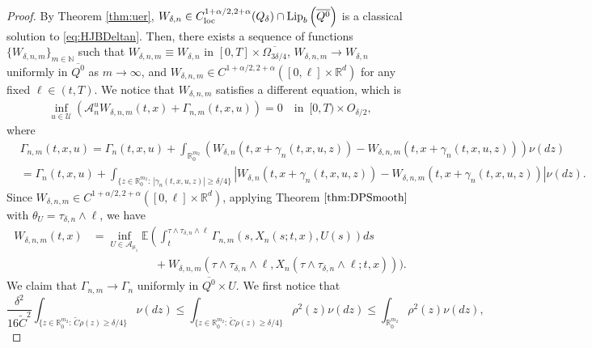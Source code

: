 \documentclass[amscd,amssymb,11pt]{article}
\numberwithin{theorem}{section}
\numberwithin{equation}{section}
\begin{document}
\begin{proof}
By Theorem \ref{thm:uer}, $W_{\delta,n}\in C^{1+\alpha/2,2+\alpha}_{\rm loc}(Q_{\delta})\cap{\rm Lip}_{b}\left(\overline{Q^{0}}\right)$ is a classical solution to \eqref{eq:HJBDeltan}. Then, there exists a sequence of functions $\{W_{\delta,n,m}\}_{m\in\mathbb N}$ such that $W_{\delta,n,m}\equiv W_{\delta,n}$ in $[0,T]\times \overline{\Omega_{3\delta/4}}$, $W_{\delta,n,m}\rightarrow W_{\delta,n}$ uniformly in $\overline{Q^{0}}$ as $m\rightarrow\infty$, and $W_{\delta,n,m}\in C^{1+\alpha/2,2+\alpha}([0,\ell]\times \mathbb R^d)$ for any fixed $\ell\in (t,T)$. We notice that $W_{\delta,n,m}$ satisfies a different equation, which is
\begin{eqnarray*}
\inf_{u\in\mathcal{U}}\left(\mathscr{A}_{n}^{u}W_{\delta,n,m}(t,x)+\Gamma_{n,m}(t,x,u)\right)=0\quad\text{in }\,[0,T)\times O_{\delta/2},
\end{eqnarray*}
where
\begin{align*}
&\Gamma_{n,m}(t,x,u)=\Gamma_{n}(t,x,u)+\int_{\mathbb{R}^{m_{2}}_{0}}\left(W_{\delta,n}\left(t,x+\gamma_{n}(t,x,u,z)\right)-W_{\delta,n,m}\left(t,x+\gamma_{n}(t,x,u,z)\right)\right)\nu(dz)
\\
&=\Gamma_{n}(t,x,u)+\int_{\{z\in \mathbb R_0^{m_2}:\,|\gamma_n(t,x,u,z)|\geq \delta/4\}}\left|W_{\delta,n}\left(t,x+\gamma_{n}(t,x,u,z)\right)-W_{\delta,n,m}\left(t,x+\gamma_{n}(t,x,u,z)\right)\right|\nu(dz).
\end{align*}
Since $W_{\delta,n,m}\in C^{1+\alpha/2,2+\alpha}([0,\ell]\times\mathbb R^d)$, applying Theorem $\ref{thm:DPSmooth}$ with $\theta_{U}=\tau_{\delta,n}\wedge\ell$, we have
\begin{align*}%
W_{\delta,n,m}(t,x)&=\inf_{U\in\mathcal{A}_{\mu_{1}}}\mathbb{E}\left(\int_{t}^{\tau\wedge\tau_{\delta,n}
\wedge\ell}\Gamma_{n,m}\left(s,X_{n}(s;t,x),U(s)\right)ds\right.\nonumber\\
&\qquad\qquad\quad\,\,\,+W_{\delta,n,m}\left(\tau\wedge\tau_{\delta,n}\wedge\ell,X_{n}(\tau\wedge\tau_{\delta,n}
\wedge\ell;t,x)\right)\bigg).
\end{align*}
We claim that $\Gamma_{n,m}\to \Gamma_n$ uniformly in $\overline{Q^{0}}\times U$. We first notice that
\begin{equation*}
\frac{\delta^2}{16{\widetilde{C}}^2}\int_{\{z\in \mathbb R_0^{m_2}:\,\widetilde{C}\rho(z)\geq \delta/4\}}\nu(dz)\leq \int_{\{z\in \mathbb R_0^{m_2}:\,\widetilde{C}\rho(z)\geq \delta/4\}}\rho^2(z)\nu(dz)\leq\int_{\mathbb R_0^{m_2}}\rho^2(z)\nu(dz),
\end{equation*}

\end{proof}
\end{document}
